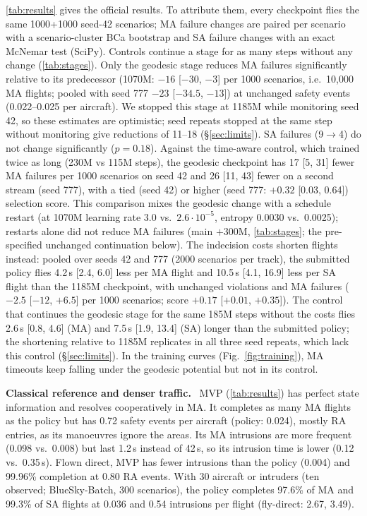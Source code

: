 \documentclass[10pt,twocolumn]{article}
\newcommand{\BSB}{BlueSky-Batch\xspace}
\renewcommand{\paragraph}[1]{\par\smallskip\noindent\textbf{#1}\ }
\begin{document}
\autoref{tab:results} gives the official results. To attribute them, every
checkpoint flies the same 1000+1000 seed-42 scenarios; MA failure changes are
paired per scenario with a scenario-cluster BCa bootstrap and SA failure changes
with an exact McNemar test (SciPy). Controls continue a stage for as many
steps without any change (\autoref{tab:stages}). Only the geodesic stage
reduces MA failures significantly relative to its predecessor (1070M: $-16$
[$-30$, $-3$] per 1000 scenarios, i.e.\ 10{,}000 MA flights; pooled with seed
777 $-23$ [$-34.5$, $-13$]) at unchanged safety events (0.022--0.025 per
aircraft). We stopped this stage at 1185M while monitoring seed 42, so these
estimates are optimistic; seed repeats stopped at the same step without monitoring give
reductions of 11--18 (\S\ref{sec:limits}). SA failures (9$\to$4) do not
change significantly ($p{=}0.18$). Against the time-aware control, which
trained twice as long (230M vs 115M steps), the geodesic checkpoint has 17 [5,
31] fewer MA failures per 1000 scenarios on seed 42 and 26 [11, 43] fewer on a
second stream (seed 777), with a tied (seed 42) or higher (seed 777: $+0.32$
[0.03, 0.64]) selection score. This comparison mixes the geodesic change
with a schedule restart (at 1070M learning rate $3.0$ vs.\ $2.6\cdot10^{-5}$,
entropy 0.0030 vs.\ 0.0025); restarts alone did not reduce MA failures (main
$+$300M, \autoref{tab:stages}; the pre-specified unchanged continuation below).
The indecision costs shorten flights instead: pooled over seeds 42 and 777
(2000 scenarios per track), the submitted policy flies 4.2\,s [2.4, 6.0]
less per MA flight and 10.5\,s [4.1, 16.9] less per SA flight than the 1185M
checkpoint, with unchanged violations and MA failures ($-2.5$ [$-12$, $+6.5$]
per 1000 scenarios; score $+0.17$ [$+0.01$, $+0.35$]). The control that
continues the geodesic stage for the same 185M steps without the costs flies
2.6\,s [0.8, 4.6] (MA) and 7.5\,s [1.9, 13.4] (SA) longer than the submitted
policy; the shortening relative to 1185M replicates in all three seed
repeats, which lack this control (\S\ref{sec:limits}). In the training curves (Fig.~\ref{fig:training}), MA timeouts keep falling
under the geodesic potential but not in its control.

\paragraph{Classical reference and denser traffic.} MVP
(\autoref{tab:results}) has perfect state information and resolves
cooperatively in MA. It completes as many MA flights as the policy but has 0.72
safety events per aircraft (policy: 0.024), mostly RA entries, as its
manoeuvres ignore the areas. Its MA intrusions are more frequent (0.098 vs.\
0.008) but last 1.2\,s instead of 42\,s, so its intrusion time is lower (0.12
vs.\ 0.35\,s). Flown direct, MVP has fewer intrusions than the policy (0.004)
and 99.96\% completion at 0.80 RA events. With 30 aircraft or intruders (ten observed;
\BSB, 300 scenarios), the policy completes 97.6\% of MA and 99.3\% of SA
flights at 0.036 and 0.54 intrusions per flight (fly-direct: 2.67, 3.49).
\end{document}
